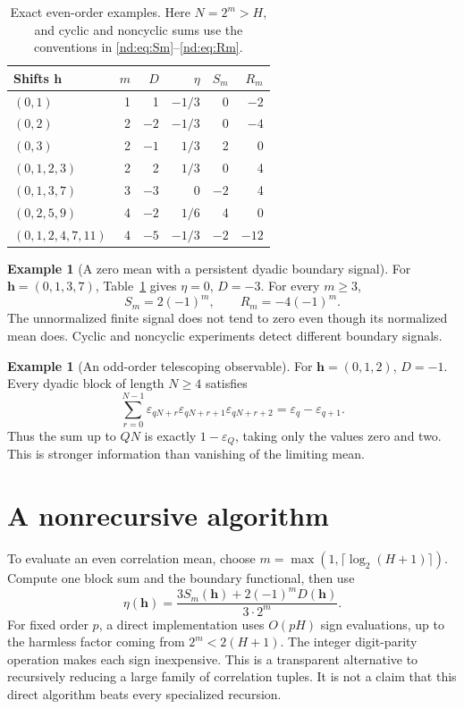 \documentclass[11pt,a4paper,oneside,openany]{book}
\numberwithin{equation}{chapter}
\theoremstyle{definition}
\newtheorem{example}[theorem]{Example}
\theoremstyle{remark}
\newcommand{\eps}{\varepsilon}
\begin{document}
\begin{table}[htbp]
\centering
\caption{Exact even-order examples. Here \(N=2^m>H\), and cyclic and
noncyclic sums use the conventions in \eqref{nd:eq:Sm}--\eqref{nd:eq:Rm}.}
\label{nd:tab:corr}
\begin{tabular}{@{}lrrrrr@{}}
\toprule
Shifts \(\bm h\)&\(m\)&\(D\)&\(\eta\)&\(S_m\)&\(R_m\)\\
\midrule
\((0,1)\)&1&1&\(-1/3\)&0&\(-2\)\\
\((0,2)\)&2&\(-2\)&\(-1/3\)&0&\(-4\)\\
\((0,3)\)&2&\(-1\)&\(1/3\)&2&0\\
\((0,1,2,3)\)&2&2&\(1/3\)&0&4\\
\((0,1,3,7)\)&3&\(-3\)&0&\(-2\)&4\\
\((0,2,5,9)\)&4&\(-2\)&\(1/6\)&4&0\\
\((0,1,2,4,7,11)\)&4&\(-5\)&\(-1/3\)&\(-2\)&\(-12\)\\
\bottomrule
\end{tabular}
\end{table}

\begin{example}[A zero mean with a persistent dyadic boundary signal]
For \(\bm h=(0,1,3,7)\), Table~\ref{nd:tab:corr} gives \(\eta=0\), \(D=-3\).
For every \(m\ge3\),
\[
 S_m=2(-1)^m,\qquad R_m=-4(-1)^m.
\]
The unnormalized finite signal does not tend to zero even though its normalized
mean does. Cyclic and noncyclic experiments detect different boundary signals.
\end{example}

\begin{example}[An odd-order telescoping observable]
For \(\bm h=(0,1,2)\), \(D=-1\). Every dyadic block of length \(N\ge4\)
satisfies
\[
 \sum_{r=0}^{N-1}\eps_{qN+r}\eps_{qN+r+1}\eps_{qN+r+2}
 =\eps_q-\eps_{q+1}.
\]
Thus the sum up to \(QN\) is exactly \(1-\eps_Q\), taking only the values zero
and two. This is stronger information than vanishing of the limiting mean.
\end{example}

\section{A nonrecursive algorithm}
To evaluate an even correlation mean, choose
\(m=\max(1,\lceil\log_2(H+1)\rceil)\). Compute one block sum and the
boundary functional, then use
\[
 \eta(\bm h)=\frac{3S_m(\bm h)+2(-1)^mD(\bm h)}{3\cdot2^m}.
\]
For fixed order \(p\), a direct implementation uses \(O(pH)\) sign evaluations,
up to the harmless factor coming from \(2^m<2(H+1)\). The integer digit-parity
operation makes each sign inexpensive. This is a transparent alternative to
recursively reducing a large family of correlation tuples. It is not a claim
that this direct algorithm beats every specialized recursion.
\end{document}
